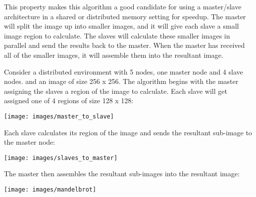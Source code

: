 This property makes this algorithm a good candidate for using a master/slave architecture in a shared or distributed memory setting for speedup. 
The master will split the image up into smaller images, and it will give each slave a small image region to calculate. 
The slaves will calculate these smaller images in parallel and send the results back to the master. 
When the master has received all of the smaller images, it will assemble them into the resultant image.

Consider a distributed environment with 5 nodes, one master node and 4 slave nodes. and an image of size 256 x 256. 
The algorithm begins with the master assigning the slaves a region of the image to calculate. 
Each slave will get assigned one of 4 regions of size 128 x 128:

\texttt{[image: images/master\_to\_slave]}

\newpage
Each slave calculates its region of the image and sends the resultant sub-image to the master node:

\texttt{[image: images/slaves\_to\_master]}
\newpage

The master then assembles the resultant sub-images into the resultant image: 

\texttt{[image: images/mandelbrot]}

